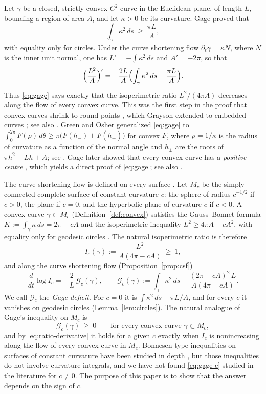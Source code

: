 \documentclass[11pt]{amsart}
\theoremstyle{definition}
\theoremstyle{remark}
\numberwithin{equation}{section}
\newcommand{\G}{\mathcal{G}}
\begin{document}
Let $\gamma$ be a closed, strictly convex $C^2$ curve in the Euclidean plane, of length $L$, bounding a region of area $A$, and let $\kappa>0$ be its curvature. Gage \cite{Ga83} proved that
\begin{equation}\label{eq:gage}
\int_\gamma \kappa^2\,ds\ \ge\ \frac{\pi L}{A},
\end{equation}
with equality only for circles. Under the curve shortening flow $\partial_t\gamma=\kappa N$, where $N$ is the inner unit normal, one has $L'=-\int\kappa^2\,ds$ and $A'=-2\pi$, so that
\[
\Bigl(\frac{L^2}{A}\Bigr)'=-\frac{2L}{A}\Bigl(\int_\gamma\kappa^2\,ds-\frac{\pi L}{A}\Bigr).
\]
Thus \eqref{eq:gage} says exactly that the isoperimetric ratio $L^2/(4\pi A)$ decreases along the flow of every convex curve. This was the first step in the proof that convex curves shrink to round points \cite{Ga84,GH86}, which Grayson extended to embedded curves \cite{Gr87}; see also \cite{CZ01,AB11}. Green and Osher \cite{GO99} generalized \eqref{eq:gage} to $\int_0^{2\pi}F(\rho)\,d\theta\ge\pi\bigl(F(h_-)+F(h_+)\bigr)$ for convex $F$, where $\rho=1/\kappa$ is the radius of curvature as a function of the normal angle and $h_\pm$ are the roots of $\pi h^2-Lh+A$; see \cite{PY08,GPY15}. Gage later showed that every convex curve has a \emph{positive centre} \cite{Ga90b}, which yields a direct proof of \eqref{eq:gage}; see also \cite{Ga24}.

The curve shortening flow is defined on every surface \cite{Ga90a,Gr89}. Let $M_c$ be the simply connected complete surface of constant curvature $c$: the sphere of radius $c^{-1/2}$ if $c>0$, the plane if $c=0$, and the hyperbolic plane of curvature $c$ if $c<0$. A convex curve $\gamma\subset M_c$ (Definition~\ref{def:convex}) satisfies the Gauss--Bonnet formula $K:=\int_\gamma\kappa\,ds=2\pi-cA$ and the isoperimetric inequality $L^2\ge 4\pi A-cA^2$, with equality only for geodesic circles \cite{Be05,Sc39,Os78}. The natural isoperimetric ratio is therefore
\[
I_c(\gamma):=\frac{L^2}{A(4\pi-cA)}\ \ge\ 1,
\]
and along the curve shortening flow (Proposition~\ref{prop:csf})
\begin{equation}\label{eq:ratio-derivative}
\frac{d}{dt}\log I_c=-\frac{2}{L}\,\G_c(\gamma),\qquad
\G_c(\gamma):=\int_\gamma\kappa^2\,ds-\frac{(2\pi-cA)^2\,L}{A(4\pi-cA)}.
\end{equation}
We call $\G_c$ the \emph{Gage deficit}. For $c=0$ it is $\int\kappa^2\,ds-\pi L/A$, and for every $c$ it vanishes on geodesic circles (Lemma~\ref{lem:circles}). The natural analogue of Gage's inequality on $M_c$ is
\begin{equation}\label{eq:gage-c}
\G_c(\gamma)\ \ge\ 0\qquad\text{for every convex curve }\gamma\subset M_c,
\end{equation}
and by \eqref{eq:ratio-derivative} it holds for a given $c$ exactly when $I_c$ is nonincreasing along the flow of every convex curve in $M_c$. Bonnesen-type inequalities on surfaces of constant curvature have been studied in depth \cite{Sa42,Kl07,ZMZC12,XZZ15}, but those inequalities do not involve curvature integrals, and we have not found \eqref{eq:gage-c} studied in the literature for $c\neq 0$. The purpose of this paper is to show that the answer depends on the sign of $c$.
\end{document}
